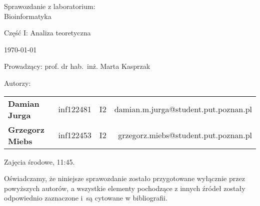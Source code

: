 \thispagestyle{empty} %

\begin{center}
{\large{Sprawozdanie z laboratorium:\\
Bioinformatyka}}

\vspace{3ex}

Część I: Analiza teoretyczna

\vspace{3ex}
{\footnotesize\today}

\end{center}


\vspace{10ex}

Prowadzący: prof. dr hab.~inż. Marta Kasprzak

\vspace{5ex}

Autorzy:
\begin{tabular}{lllr}
\textbf{Damian Jurga} & inf122481 & I2 & damian.m.jurga@student.put.poznan.pl \\
\textbf{Grzegorz Miebs} & inf122453 & I2 & grzegorz.miebs@student.put.poznan.pl \\
\end{tabular}

\vspace{5ex}

Zajęcia środowe, 11:45.

\vspace{35ex}

\noindent Oświadczamy, że niniejsze sprawozdanie zostało przygotowane wyłącznie przez powyższych autorów,
a wszystkie elementy pochodzące z innych źródeł zostały odpowiednio zaznaczone i~są cytowane w bibliografii.  

\newpage

